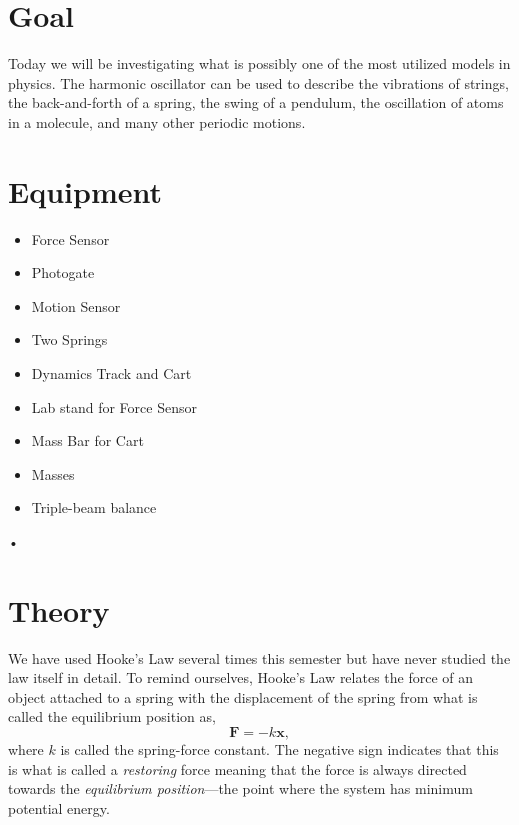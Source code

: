 \documentclass[main.tex]{subfiles}
\begin{document}
\section*{Goal}
Today we will be investigating what is possibly one of the most utilized models in physics. The harmonic oscillator can be used to describe the vibrations of strings, the back-and-forth of a spring, the swing of a pendulum, the oscillation of atoms in a molecule, and many other periodic motions.

\section*{Equipment}
\begin{itemize}
\item
Force Sensor
\item
Photogate
\item
Motion Sensor
\item
Two Springs
\item
Dynamics Track and Cart
\item
Lab stand for Force Sensor
\item
Mass Bar for Cart
\item
Masses
\item
Triple-beam balance
\end{itemize}•

\section*{Theory}
We have used Hooke's Law several times this semester but have never studied the law itself in detail. To remind ourselves, Hooke's Law relates the force of an object attached to a spring with the displacement of the spring from what is called the equilibrium position as,
\begin{equation} \label{eq:Hooke}
\mathbf{F}=-k\mathbf{x},
\end{equation}
where $k$ is called the spring-force constant. The negative sign indicates that this is what is called a \emph{restoring} force meaning that the force is always directed towards the \emph{equilibrium position}---the point where the system has minimum potential energy.
\end{document}
